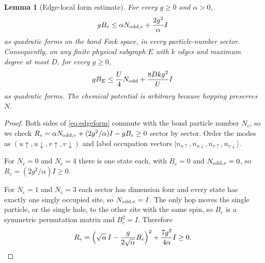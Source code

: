\documentclass[11pt]{article}
\newtheorem{lemma}{Lemma}
\begin{document}
\begin{lemma}[Edge-local form estimate]\label{lem:form}
For every $g\ge0$ and $\alpha>0$,
\begin{equation}\label{eq:edgeform}
 gB_e\le\alpha N_{{\rm odd},e}+\frac{2g^2}{\alpha}I
\end{equation}
as quadratic forms on the bond Fock space, in every particle-number sector. Consequently, on any finite physical subgraph $E$ with $k$ edges and maximum degree at most $D$, for every $g\ge0$,
\begin{equation}\label{eq:form}
 gB_E\le\frac U4N_{\rm odd}+\frac{8Dkg^2}{U}I
\end{equation}
as quadratic forms. The chemical potential is arbitrary because hopping preserves $N$.
\end{lemma}
\begin{proof}
Both sides of \eqref{eq:edgeform} commute with the bond particle number $N_e$, so we check $R_e=\alpha N_{{\rm odd},e}+(2g^2/\alpha)I-gB_e\ge0$ sector by sector. Order the modes as $(u\uparrow,u\downarrow,v\uparrow,v\downarrow)$ and label occupation vectors $|n_{u\uparrow},n_{u\downarrow},n_{v\uparrow},n_{v\downarrow}\rangle$.

For $N_e=0$ and $N_e=4$ there is one state each, with $B_e=0$ and $N_{{\rm odd},e}=0$, so $R_e=(2g^2/\alpha)I\ge0$.

For $N_e=1$ and $N_e=3$ each sector has dimension four and every state has exactly one singly occupied site, so $N_{{\rm odd},e}=I$. The only hop moves the single particle, or the single hole, to the other site with the same spin, so $B_e$ is a symmetric permutation matrix and $B_e^2=I$. Therefore
\[
 R_e=\Bigl(\sqrt\alpha\,I-\frac{g}{2\sqrt\alpha}B_e\Bigr)^2+\frac{7g^2}{4\alpha}I\ge0.
\]


\end{proof}
\end{document}
